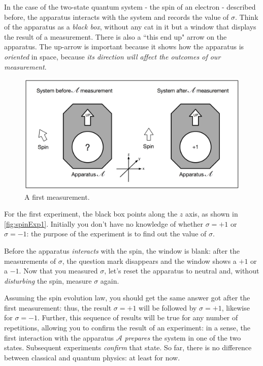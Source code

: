 \documentclass[a4paper,10pt]{article}
\begin{document}
In the case of the two-state quantum system - the spin of an electron - described before, the apparatus interacts with the system and records the value of $\sigma$. Think of the apparatus as a \textit{black box}, without any cat in it but a window that displays the result of a measurement. There is also a ``this end up" arrow on the apparatus. The up-arrow is important because it shows how the apparatus is \textit{oriented} in space, because \textit{its direction will affect the outcomes of our measurement}.  

\begin{figure}[!htb]
\begin{center}
\includegraphics[width=4.5in]{images/spinExp1.png}
\caption{A first measurement.}
\label{fig:spinExp1}
\end{center}
\end{figure}

For the first experiment, the black box points along the $z$ axis, as shown in \autoref{fig:spinExp1}. Initially you don't have no knowledge of whether $\sigma = +1$ or $\sigma = -1$: the purpose of the experiment is to find out the value of $\sigma$.

Before the apparatus \textit{interacts} with the spin, the window is blank: after the measurements of $\sigma$, the question mark disappears and the window shows a $+1$ or a $-1$. Now that you measured $\sigma$, let's reset the apparatus to neutral and, without \textit{disturbing} the spin, measure $\sigma$ again.

Assuming the spin evolution law, you should get the same answer got after the first measurement: thus, the result $\sigma = +1$ will be followed by $\sigma = +1$, likewise for $\sigma = -1$. Further, this sequence of results will be true for any number of repetitions, allowing you to confirm the result of an experiment: in a sense, the first interaction with the apparatus $\mathcal{A}$ \textit{prepares} the system in one of the two states. Subsequent experiments \textit{confirm} that state. So far, there is no difference between classical and quantum physics: at least for now.
\end{document}
